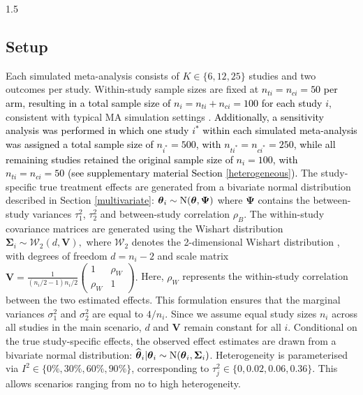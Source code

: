 \documentclass{article}
\newcommand{\mycolor}[1]{\textcolor{black}{#1}}
\begin{document}
\begin{spacing}{1.5}
\subsection{Setup}

Each simulated meta-analysis consists of $K \in \{6,12,25\}$ studies and two outcomes per study. Within-study sample sizes are fixed at \mycolor{$n_{ti}=n_{ci}=50$ per arm, resulting in a total sample size of $n_i=n_{ti}+n_{ci}=100$ for each study $i$}, consistent with typical MA simulation settings \cite{inthout2014hartung, saracini2025addressing}. \mycolor{Additionally, a sensitivity analysis was performed in which one study $i^\ast$ within each simulated meta-analysis was assigned a total sample size of $n_{i^\ast}=500$, with $n_{ti^\ast}=n_{ci^\ast}=250$, while all remaining studies retained the original sample size of $n_i=100$, with $n_{ti}=n_{ci}=50$ (see supplementary material Section \ref{heterogeneous}).} The study-specific true treatment effects are generated from a bivariate normal distribution described in Section \ref{multivariate}: $\boldsymbol{\theta}_i \sim \operatorname{N}(\boldsymbol{\theta}, \boldsymbol{\Psi})$ where $\boldsymbol{\Psi}$ contains the between-study variances $\tau^2_1$, $\tau^2_2$ and between-study correlation $\rho_B$. The within-study covariance matrices are generated using the Wishart distribution $\boldsymbol{\Sigma}_i \sim \mathcal{W}_2(d, \boldsymbol{V}),$ where $\mathcal{W}_2$ denotes the 2-dimensional Wishart distribution \cite[p.~366]{held2020likelihood}, with degrees of freedom $d = n_i - 2$ and scale matrix
$\boldsymbol{V} = \frac{1}{(n_i / 2 - 1)n_i/2}
\begin{pmatrix}
1 & \rho_W \\
\rho_W & 1
\end{pmatrix}.$ Here, $\rho_W$ represents the within-study correlation between the two estimated effects. This formulation ensures that the marginal variances $\sigma_1^2$ and $\sigma_2^2$ are equal to $4/n_i$. Since we assume equal study sizes $n_i$ across all studies in the main scenario, $d$ and $\boldsymbol{V}$ remain constant for all $i$. Conditional on the true study-specific effects, the observed effect estimates are drawn from a bivariate normal distribution: $\widehat{\boldsymbol{\theta}}_i | \boldsymbol{\theta}_i \sim \operatorname{N}(\boldsymbol{\theta}_i, {\boldsymbol{\Sigma}}_i)$. Heterogeneity is parameterised via $I^2 \in \{0\%, 30\%, 60\%, 90\%\}$, corresponding to $\tau_j^2 \in \{0,0.02,0.06,0.36\}$. This allows scenarios ranging from no to high heterogeneity.


\end{spacing}
\end{document}
